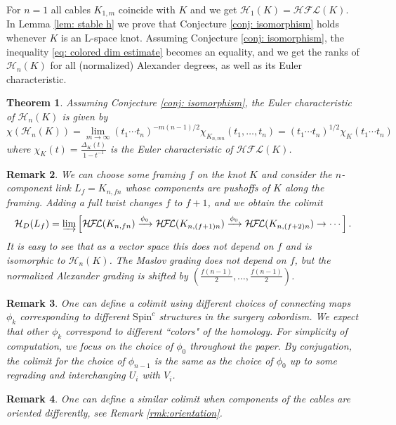 \documentclass{amsart}
\newtheorem{theorem}{Theorem}[section]
\newtheorem{remark}[theorem]{Remark}
\newcommand{\CH}{\mathcal{H}}
\newcommand{\cHFL}{\mathcal{H\!F\! L}}
\newcommand{\Spin}{\text{Spin}^{c}}
\begin{document}
For $n=1$ all cables $K_{1,m}$ coincide with $K$ and  we get $\CH_1(K)=\cHFL(K)$. In Lemma \ref{lem: stable h} we prove that Conjecture \ref{conj: isomorphism} holds whenever $K$ is an L-space knot. Assuming Conjecture \ref{conj: isomorphism}, the inequality \eqref{eq: colored dim estimate} becomes an equality, and we get the ranks of $\CH_n(K)$ for all (normalized) Alexander degrees, as well as its Euler characteristic.

\begin{theorem}
Assuming Conjecture \ref{conj: isomorphism}, the Euler characteristic of $\CH_{n}(K)$ is given by 
$$
\chi(\CH_{n}(K))=\lim_{m\to \infty}(t_1\cdots t_n)^{-m(n-1)/2}\chi_{K_{n,mn}}(t_1,\ldots,t_n)=(t_1\cdots t_n)^{1/2}\chi_K(t_1\cdots t_n)
$$
where $\chi_K(t)=\frac{\Delta_K(t)}{1-t^{-1}}$ is the Euler characteristic of $\cHFL(K)$.
\end{theorem}

\begin{remark}
\label{rem: framing dependence}
We can choose some framing $f$ on the knot $K$ and consider the $n$-component link $L_f=K_{n,fn}$ whose components are pushoffs of $K$ along the framing. Adding a full twist changes $f$ to $f+1$, and we obtain  the colimit
$$
\CH_D(L_f)=\varinjlim\left[\cHFL(K_{n,fn})\xrightarrow{\phi_0}\cHFL(K_{n,(f+1)n})\xrightarrow{\phi_0}\cHFL(K_{n,(f+2)n})\to\cdots\right].
$$
It is easy to see that as a vector space this does not depend on $f$ and is isomorphic to $\CH_n(K)$. The Maslov grading does not depend on $f$, but the normalized Alexander grading is shifted by $\left(\frac{f(n-1)}{2},\ldots,\frac{f(n-1)}{2}\right)$.
\end{remark}



\begin{remark}
  One can define a colimit using different choices of connecting maps $\phi_k$ corresponding to different $\Spin$ structures in the surgery cobordism. We expect that other $\phi_k$  correspond to different ``colors" of the homology. For simplicity of computation, we focus on the choice of $\phi_0$ throughout the paper. By conjugation, the colimit for the choice of $\phi_{n-1}$ is the same as the choice of $\phi_0$ up to some regrading and interchanging $U_i$ with $V_i$. 
\end{remark}

\begin{remark}
One can define a similar colimit when components of the cables are oriented differently, see Remark \ref{rmk:orientation}.
\end{remark}
\end{document}
